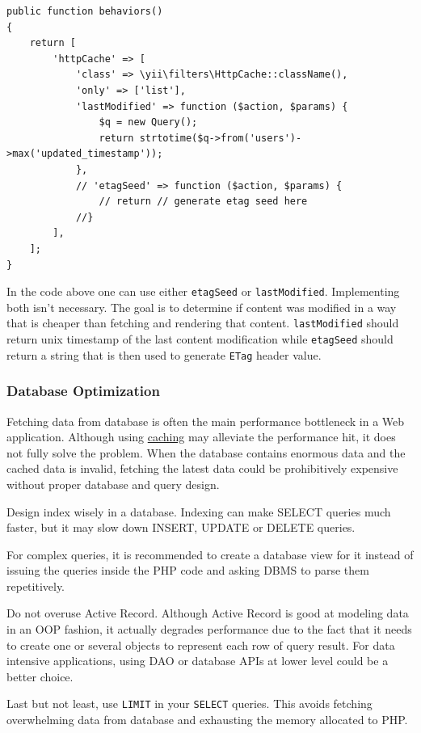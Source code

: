 \lstset{language=php}\begin{lstlisting}
public function behaviors()
{
    return [
        'httpCache' => [
            'class' => \yii\filters\HttpCache::className(),
            'only' => ['list'],
            'lastModified' => function ($action, $params) {
                $q = new Query();
                return strtotime($q->from('users')->max('updated_timestamp'));
            },
            // 'etagSeed' => function ($action, $params) {
                // return // generate etag seed here
            //}
        ],
    ];
}
\end{lstlisting}
In the code above one can use either \lstinline|etagSeed| or \lstinline|lastModified|. Implementing both isn't necessary. The goal is to
determine if content was modified in a way that is cheaper than fetching and rendering that content. \lstinline|lastModified|
should return unix timestamp of the last content modification while \lstinline|etagSeed| should return a string that is then
used to generate \lstinline|ETag| header value.

\subsubsection{Database Optimization}
Fetching data from database is often the main performance bottleneck in
a Web application.
Although using \hyperref[caching.md::Query-Caching]{caching} may alleviate the performance hit,
it does not fully solve the problem. When the database contains enormous data
and the cached data is invalid, fetching the latest data could be prohibitively
expensive without proper database and query design.

Design index wisely in a database. Indexing can make SELECT queries much faster,
but it may slow down INSERT, UPDATE or DELETE queries.

For complex queries, it is recommended to create a database view for it instead
of issuing the queries inside the PHP code and asking DBMS to parse them repetitively.

Do not overuse Active Record. Although Active Record is good at modeling data
in an OOP fashion, it actually degrades performance due to the fact that it needs
to create one or several objects to represent each row of query result. For data
intensive applications, using DAO or database APIs at lower level could be
a better choice.

Last but not least, use \lstinline|LIMIT| in your \lstinline|SELECT| queries. This avoids fetching
overwhelming data from database and exhausting the memory allocated to PHP.

